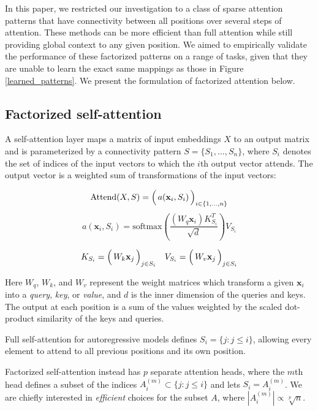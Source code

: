 \documentclass{article}
\begin{document}
In this paper, we restricted our investigation to a class of sparse attention patterns that have connectivity between all positions over several steps of attention. These methods can be more efficient than full attention while still providing global context to any given position. We aimed to empirically validate the performance of these factorized patterns on a range of tasks, given that they are unable to learn the exact same mappings as those in Figure \ref{learned_patterns}. We present the formulation of factorized attention below.

\subsection{Factorized self-attention}
A self-attention layer maps a matrix of input embeddings $X$ to an output matrix and is parameterized by a connectivity pattern $S = \{S_1, ..., S_n\}$, where $S_i$ denotes the set of indices of the input vectors to which the $i$th output vector attends. The output vector is a weighted sum of transformations of the input vectors:

\begin{equation}\label{attend_fn}
\mathrm{Attend}(X, S) = \Bigl( \, a(\mathbf{x}_i, S_i) \, \Bigr)_{i \in \{1, ..., n\}}
\end{equation}
\begin{equation}
a(\mathbf{x}_i, S_i) = \mathrm{softmax}\left(\frac{(W_q\mathbf{x}_i)K_{S_i}^T}{\sqrt{d}}\right)V_{S_i}
\end{equation}

\begin{equation}
K_{S_i} = \Bigl( \, W_k \mathbf{x}_j \, \Bigr)_{j \in S_i} \quad V_{S_i} = \Bigl( \, W_v \mathbf{x}_j \, \Bigr)_{j \in S_i}
\end{equation}


Here $W_q$, $W_k$, and $W_v$ represent the weight matrices which transform a given $\mathbf{x}_i$ into a \textit{query}, \textit{key}, or \textit{value}, and $d$ is the inner dimension of the queries and keys. The output at each position is a sum of the values weighted by the scaled dot-product similarity of the keys and queries.

Full self-attention for autoregressive models defines $S_i = \{j : j \le i\}$, allowing every element to attend to all previous positions and its own position. 

Factorized self-attention instead has $p$ separate attention heads, where the $m$th head defines a subset of the indices $A_{i}^{(m)} \subset \{j : j \le i\}$ and lets $S_i = A_{i}^{(m)}$.  We are chiefly interested in \textit{efficient} choices for the subset $A$, where $|A_{i}^{(m)}| \propto \sqrt[p]{n}$.
\end{document}
